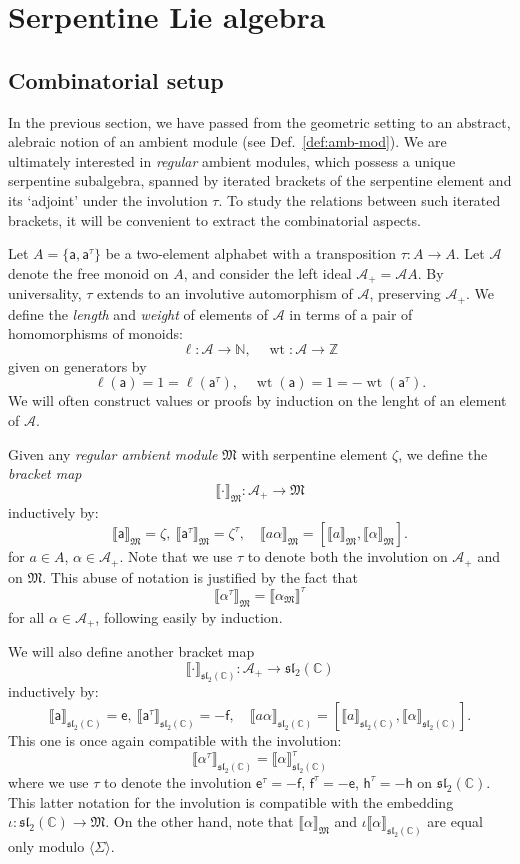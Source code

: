 \documentclass{article}
\def\llb{\llbracket}
\def\rrb{\rrbracket}
\def\fsl{\mathfrak{sl}}
\def\fM{\mathfrak{M}}
\def\sA{\mathcal{A}}
\def\ZZ{\mathbb{Z}}
\def\NN{\mathbb{N}}
\def\CC{\mathbb{C}}
\def\inv{\tau} %
\DeclareMathOperator{\wt}{\mathrm{wt}}
\def\a{\mathsf{a}}
\def\e{\mathsf{e}}
\def\h{\mathsf{h}}
\def\f{\mathsf{f}}
\theoremstyle{definition}
\begin{document}
\section{Serpentine Lie algebra}
\label{sec:algebra}
\subsection{Combinatorial setup}

In the previous section, we have
passed from the geometric setting
to an abstract, alebraic notion of an ambient module
(see Def.~\ref{def:amb-mod}). We are ultimately interested
in \emph{regular} ambient modules, which possess a unique
serpentine subalgebra, spanned by iterated brackets of
the serpentine element and its `adjoint' under the involution $\tau$.
To study the relations between such iterated brackets, it will be
convenient to extract the combinatorial aspects.

Let $A = \{\a,\a^\inv\}$ be a two-element
alphabet with a transposition $\inv:A \to A$.
Let $\sA$ denote the free monoid on $A$,
and consider the left ideal
$\sA_+ = \sA A$.
By universality, $\tau$ extends to an involutive
automorphism of $\sA$, preserving $\sA_+$. 
We define the \emph{length} and \emph{weight}
of elements of $\sA$ in terms of a pair of homomorphisms
of monoids:
$$
\ell : \sA \to \NN,\quad \wt : \sA \to \ZZ
$$
given on generators by
$$
\ell(\a) =1= \ell(\a^\tau),\quad 
\wt(\a) =1= -\wt(\a^\tau).
$$
We will often construct values or proofs by induction on the
lenght of an element of $\sA$.

Given any \emph{regular
ambient module} $\fM$ with serpentine element $\zeta$, we define the \emph{bracket map}
$$
\llb\cdot\rrb_\fM : \sA_+ \to \fM
$$
inductively by:
$$ \llb\a\rrb_\fM=\zeta,\ \llb\a^\inv\rrb_\fM=\zeta^\inv,\quad
\llb a \alpha\rrb_\fM = [ \llb a\rrb_\fM, \llb \alpha\rrb_\fM ].
$$
for $a \in A$, $\alpha\in\sA_+$.
Note that we use $\tau$ to denote
both the involution on $\sA_+$ and on $\fM$.
This abuse of notation is justified by the fact that 
$$
\llb\alpha^\tau\rrb_\fM = \llb\alpha_\fM\rrb^\tau
$$
for all $\alpha\in\sA_+$, following easily
by induction.

We will also define another bracket map
$$
\llb\cdot\rrb_{\fsl_2(\CC)} : \sA_+ \to \fsl_2(\CC)
$$
inductively by:
$$ \llb\a\rrb_{\fsl_2(\CC)}=\e,\ \llb\a^\inv\rrb_{\fsl_2(\CC)}=-\f,\quad
\llb a \alpha\rrb_{\fsl_2(\CC)} = [ \llb a\rrb_{\fsl_2(\CC)}, \llb\alpha\rrb_{\fsl_2(\CC)} ]. $$
This one is once again compatible with the involution:
$$ \llb\alpha^\tau\rrb_{\fsl_2(\CC)} = \llb\alpha\rrb_{\fsl_2(\CC)}^\tau $$
where
we use $\tau$ to denote the involution 
$\e^\tau=-\f$, $\f^\tau=-\e$, $\h^\tau=-\h$
on $\fsl_2(\CC)$. This latter notation for the involution is compatible
with the embedding $\iota:\fsl_2(\CC)\to\fM$.
On the other hand, note that
$\llb\alpha\rrb_\fM$ and $\iota\llb\alpha\rrb_{\fsl_2(\CC)}$
are equal only modulo $\langle\Sigma\rangle$.
\end{document}
